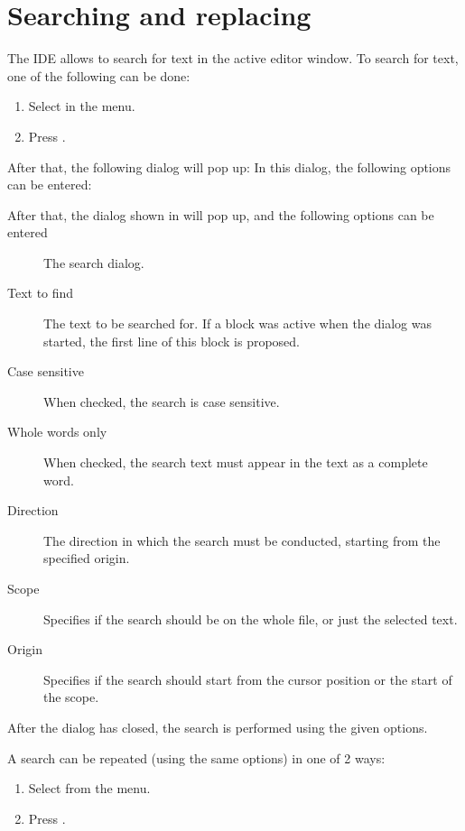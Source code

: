 \section{Searching and replacing}
\label{se:searching}
The IDE allows to search for text in the active editor window. 
To search for text, one of the following can be done:
\begin{enumerate}
\item Select  in the menu.
\item Press .
\end{enumerate}
\begin{htmlonly}
After that, the following dialog will pop up:
In this dialog, the following options can be entered:
\end{htmlonly}
\begin{latexonly}
After that, the dialog shown in  will pop up,
and the following options can be entered
\begin{figure}[ht]
\caption{The search dialog.}\label{fig:search}
\ifpdf
{}
\else
{}
\fi
\end{figure}
\end{latexonly}

\begin{description}
\item[Text to find] The text to be searched for. If a block was active when
the dialog was started, the first line of this block is proposed.
\item[Case sensitive] When checked, the search is case sensitive.
\item[Whole words only] When checked, the search text must appear in the
text as a complete word.
\item[Direction] The direction in which the search must be conducted,
starting from the specified origin.
\item[Scope] Specifies if the search should be on the whole file, or just the selected
text.
\item[Origin] Specifies if the search should start from the cursor position or the start
of the scope.
\end{description}
After the dialog has closed, the search is performed using the given options.

A search can be repeated (using the same options) in one of 2 ways:
\begin{enumerate}
\item Select  from the menu.
\item Press .
\end{enumerate}


